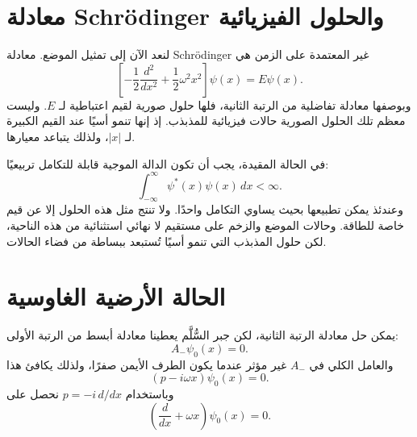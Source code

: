 \begin{classroomqa}
\end{classroomqa}

\section{معادلة Schr\"odinger والحلول الفيزيائية}

لنعد الآن إلى تمثيل الموضع. معادلة Schr\"odinger غير المعتمدة على الزمن هي
\begin{equation}
\left[
-\frac12\frac{d^{2}}{dx^{2}}
+\frac12\omega^{2}x^{2}
\right]\psi(x)=E\psi(x).
\end{equation}
وبوصفها معادلة تفاضلية من الرتبة الثانية، فلها حلول صورية لقيم اعتباطية لـ \(E\). وليست معظم تلك الحلول الصورية حالات فيزيائية للمذبذب. إذ إنها تنمو أسيًا عند القيم الكبيرة لـ \(\lvert x\rvert\)، ولذلك يتباعد معيارها.

في الحالة المقيدة، يجب أن تكون الدالة الموجية قابلة للتكامل تربيعيًا:
\begin{equation}
\int_{-\infty}^{\infty}\psi^{*}(x)\psi(x)\,dx<\infty.
\end{equation}
وعندئذ يمكن تطبيعها بحيث يساوي التكامل واحدًا. ولا تنتج مثل هذه الحلول إلا عن قيم خاصة للطاقة. وحالات الموضع والزخم على مستقيم لا نهائي استثنائية من هذه الناحية، لكن حلول المذبذب التي تنمو أسيًا تُستبعد ببساطة من فضاء الحالات.

\section{الحالة الأرضية الغاوسية}

يمكن حل معادلة الرتبة الثانية، لكن جبر السُّلَّم يعطينا معادلة أبسط من الرتبة الأولى:
\begin{equation}
A_{-}\psi_{0}(x)=0.
\end{equation}
والعامل الكلي في \(A_{-}\) غير مؤثر عندما يكون الطرف الأيمن صفرًا، ولذلك يكافئ هذا
\begin{equation}
(p-i\omega x)\psi_{0}(x)=0.
\end{equation}
وباستخدام \(p=-i\,d/dx\) نحصل على
\begin{equation}
\left(\frac{d}{dx}+\omega x\right)\psi_{0}(x)=0.
\end{equation}

